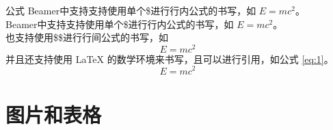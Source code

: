 \documentclass[aspectratio=169]{beamer}
\begin{document}
\begin{frame}{公式}
    Beamer中支持支持使用单个\$进行行内公式的书写，如 $E=mc^2$。\\
    Beamer中支持支持使用单个\$进行行内公式的书写，如 $E=mc^2$。\\
    \vspace{\baselineskip} %
    也支持使用\$\$进行行间公式的书写，如 
    $$
    E=mc^2
    $$
    并且还支持使用 \LaTeX{} 的数学环境来书写，且可以进行引用，如公式 \eqref{eq:1}。
    \begin{equation}
        \label{eq:1}
        E=mc^2
    \end{equation}
\end{frame}

\section{图片和表格}
\end{document}
